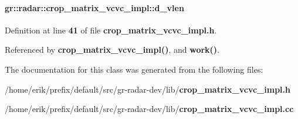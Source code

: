 \paragraph[{d\+\_\+vlen}]{ gr\+::radar\+::crop\+\_\+matrix\+\_\+vcvc\+\_\+impl\+::d\+\_\+vlen}\label{classgr_1_1radar_1_1crop__matrix__vcvc__impl_a1d7aedfca0b822b1fc29778961a136ed}


Definition at line {\bf 41} of file {\bf crop\+\_\+matrix\+\_\+vcvc\+\_\+impl.\+h}.



Referenced by {\bf crop\+\_\+matrix\+\_\+vcvc\+\_\+impl()}, and {\bf work()}.



The documentation for this class was generated from the following files\+:\begin{DoxyCompactItemize}
\item 
/home/erik/prefix/default/src/gr-\/radar-\/dev/lib/{\bf crop\+\_\+matrix\+\_\+vcvc\+\_\+impl.\+h}\item 
/home/erik/prefix/default/src/gr-\/radar-\/dev/lib/{\bf crop\+\_\+matrix\+\_\+vcvc\+\_\+impl.\+cc}\end{DoxyCompactItemize}
